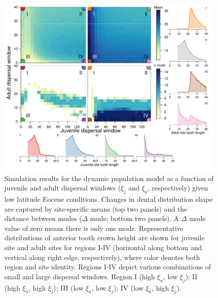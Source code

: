 \documentclass[]{rsos}%
\begin{document}
\begin{figure}[ht]
  \centering
  \includegraphics[width=1\linewidth]{fig_means_peaks_eocene_lowlatitude_rev.pdf}  

\caption{Simulation results for the dynamic population model as a function of juvenile and adult dispersal windows ($\xi_j$ and $\xi_a$, respectively) given low latitude Eocene conditions. 
Changes in dental distribution shape are captured by site-specific means (top two panels) and the distance between modes ($\Delta$ mode; bottom two panels).
A $\Delta$ mode value of zero means there is only one mode.
Representative distributions of anterior tooth crown height are shown for juvenile site and adult sites for regions I-IV  (horizontal along bottom and vertical along right edge, respectively), where color denotes both region and site identity.
Regions I-IV depict various combinations of small and large dispersal windows. Region I (high $\xi_a$, low $\xi_j$); II (high $\xi_a$, high $\xi_j$); III (low $\xi_a$, low $\xi_j$); IV (low $\xi_a$, high $\xi_j$).
}
\label{fig:simlow}
\end{figure}



\clearpage



\end{document}
